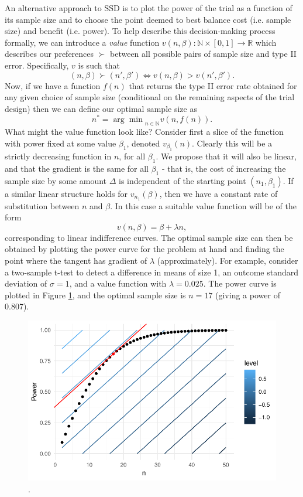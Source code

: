 \documentclass[sagev]{sagej}
\begin{document}
An alternative approach to SSD is to plot the power of the trial as a function of its sample size and to choose the point deemed to best balance cost (i.e. sample size) and benefit (i.e. power). To help describe this decision-making process formally, we can introduce a \emph{value} function $v(n, \beta): \mathbb{N} \times [0,1] \rightarrow \mathbb{R}$ which describes our preferences $\succ$ between all possible pairs of sample size and type II error. Specifically, $v$ is such that
$$
(n, \beta) \succ (n', \beta') \Leftrightarrow v(n, \beta) > v(n', \beta').
$$
Now, if we have a function $f(n)$ that returns the type II error rate obtained for any given choice of sample size (conditional on the remaining aspects of the trial design) then we can define our optimal sample size as
$$
n^* = {\arg\min}_{n \in \mathbb{N}} v(n, f(n)).
$$
What might the value function look like? Consider first a slice of the function with power fixed at some value $\beta_1$, denoted $v_{\beta_1}(n)$. Clearly this will be a strictly decreasing function in $n$, for all $\beta_1$. We propose that it will also be linear, and that the gradient is the same for all $\beta_1$ - that is, the cost of increasing the sample size by some amount $\Delta$ is independent of the starting point $(n_1, \beta_1)$. If a similar linear structure holds for $v_{n_1}(\beta)$, then we have a constant rate of substitution between $n$ and $\beta$. In this case a suitable value function will be of the form 
$$
v(n, \beta) = \beta + \lambda n,
$$
corresponding to linear indifference curves. The optimal sample size can then be obtained by plotting the power curve for the problem at hand and finding the point where the tangent has gradient of $\lambda$ (approximately). For example, consider a two-sample t-test to detect a difference in means of size 1, an outcome standard deviation of $\sigma = 1$, and a value function with $\lambda = 0.025$. The power curve is plotted in Figure \ref{fig:ex1_tangent}, and the optimal sample size is $n = 17$ (giving a power of 0.807). 

\begin{figure}
\centering
\includegraphics[scale=0.8]{./figures/ex1_tangent}
\caption{.}
\label{fig:ex1_tangent}
\end{figure}
\end{document}
